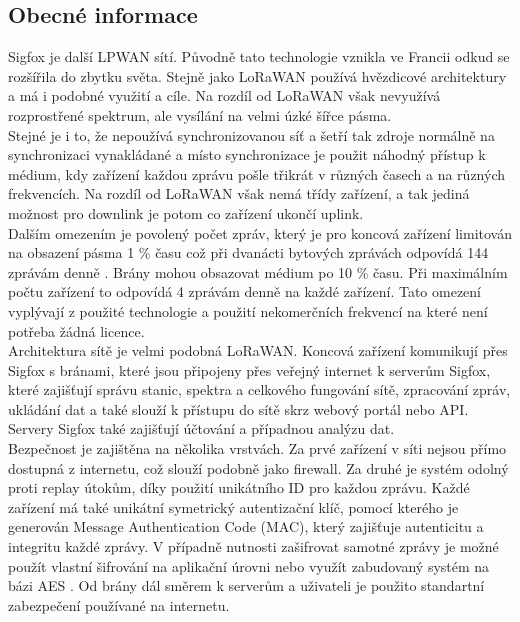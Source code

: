 \documentclass{ctuthesis}
\begin{document}
\subsection{Obecné informace}
Sigfox je další LPWAN sítí. Původně tato technologie vznikla ve Francii odkud se rozšířila do zbytku světa. Stejně jako LoRaWAN používá hvězdicové architektury a má i podobné využití a cíle. Na rozdíl od LoRaWAN však nevyužívá rozprostřené spektrum, ale vysílání na velmi úzké šířce pásma.\\
Stejné je i to, že nepoužívá synchronizovanou síť a šetří tak zdroje normálně na synchronizaci vynakládané a místo synchronizace je použit náhodný přístup k médium, kdy zařízení každou zprávu pošle třikrát v různých časech a na různých frekvencích. Na rozdíl od LoRaWAN však nemá třídy zařízení, a tak jediná možnost pro downlink je potom co zařízení ukončí uplink.\\
Dalším omezením je povolený počet zpráv, který je pro koncová zařízení limitován na obsazení pásma 1 \% času což při dvanácti bytových zprávách odpovídá 144 zprávám denně \cite{sigfox2017}. Brány mohou obsazovat médium po 10 \% času. Při maximálním počtu zařízení to odpovídá 4 zprávám denně na každé zařízení. Tato omezení vyplývají z použité technologie a použití nekomerčních frekvencí na které není potřeba žádná licence.\\
Architektura sítě je velmi podobná LoRaWAN. Koncová zařízení komunikují přes Sigfox s bránami, které jsou připojeny přes veřejný internet k serverům Sigfox, které zajišťují správu stanic, spektra a celkového fungování sítě, zpracování zpráv, ukládání dat a také slouží k přístupu do sítě skrz webový portál nebo API. Servery Sigfox také zajišťují účtování a případnou analýzu dat.\\
Bezpečnost je zajištěna na několika vrstvách. Za prvé zařízení v síti nejsou přímo dostupná z internetu, což slouží podobně jako firewall. Za druhé je systém odolný proti replay útokům, díky použití unikátního ID pro každou zprávu. Každé zařízení má také unikátní symetrický autentizační klíč, pomocí kterého je generován Message Authentication Code (MAC), který zajišťuje autenticitu a integritu každé zprávy. V případně nutnosti zašifrovat samotné zprávy je možné použít vlastní šifrování na aplikační úrovni nebo využít zabudovaný systém na bázi AES \cite{sigsec}. Od brány dál směrem k serverům a uživateli je použito standartní zabezpečení používané na internetu.
\end{document}
